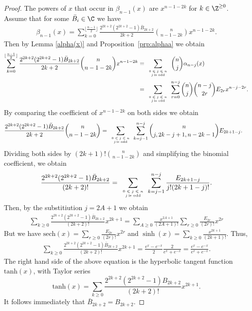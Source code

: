 \documentclass[11pt]{amsart}
\begin{document}
\begin{proof}
The powers of $x$ that occur in $\beta_{n-1}(x)$ are $x^{n-1-2k}$ for $k\in\Z^{\geq 0}$. Assume that for some  $\bar{B}_i\in\C$ we have 
\begin{align*}
\beta_{n-1}(x)=\sum_{k=0}^{\lfloor \frac{n-1}{2}\rfloor} \frac{2^{2k+2}(2^{2k+2}-1)\bar{B}_{2k+2}}{2k+2}
{n \choose n-1-2k}x^{n-1-2k}.
\end{align*}
Then by Lemma \ref{alpha(x)} and Proposition~\ref{prp:alphaa} we obtain
\begin{align*}
\sum_{k=0}^{\lfloor \frac{n-1}{2}\rfloor} \frac{2^{2k+2}(2^{2k+2}-1)\bar{B}_{2k+2}}{2k+2}
{n \choose n-1-2k}x^{n-1-2k}&=\sum_{\tiny
\begin{array}{cc}
0\leqslant j\leqslant n\\
j \, \text{is odd}
\end{array}} {n \choose j}\alpha_{n-j}(x)\\
&=\sum_{\tiny
\begin{array}{cc}
0\leqslant j\leqslant n\\
j \, \text{is odd}
\end{array}}\sum_{r=0}^{n-j} {n \choose j}{n-j \choose 2r}E_{2r}x^{n-j-2r}.
\end{align*}
By comparing the coefficient of $x^{n-1-2k}$ on both sides we obtain
\begin{align*}
&\frac{2^{2k+2}(2^{2k+2}-1)\bar{B}_{2k+2}}{2k+2}
{n \choose n-1-2k}
=\sum_{\tiny
\begin{array}{cc}
0\leqslant j\leqslant n\\
j \, \text{is odd}
\end{array}}\sum_{k=j-1}^{n-j}{n \choose j,2k-j+1,n-2k-1}E_{2k+1-j}.
\end{align*}
Dividing both sides by $(2k+1)!{n\choose n-1-2k}$ and simplifying the binomial coefficient, we obtain
\begin{align*}
\frac{2^{2k+2}(2^{2k+2}-1)\bar{B}_{2k+2}}{(2k+2)!}=
\sum_{\tiny
\begin{array}{cc}
0\leqslant j\leqslant n\\
j \, \text{is odd}
\end{array}}\sum_{k=j-1}^{n-j}\frac{E_{2k+1-j}}{j!(2k+1-j)!}.
\end{align*}
Then, by the substitiution $j=2A
+1$ we obtain 
\begin{align*}
\sum_{k\geqslant 0}\frac{2^{2k+2}(2^{2k+2}-1)\bar{B}_{2k+2}}{(2k+2)!}x^{2k+1}=\sum_{A\geqslant 0}\frac{x^{2A+1}}{(2A+1)!}\sum_{r\geqslant 0}\frac{E_{2r}}{(2r)!}x^{2r}
\end{align*}
But we have
$\text{sech}(x)=\sum_{r\geqslant 0}\frac{E_{2r}}{(2r)!}x^{2r} $ and $\sinh(x)=\sum_{k \geq 0} \frac{x^{2k+1}}{(2k+1)!}$.
Thus,
\begin{align*}
\sum_{k\geqslant 0}\frac{2^{2k+2}(2^{2k+2}-1)\bar{B}_{2k+2}}{(2k+2)!}x^{2k+1}
=\frac{e^x-e^{-x}}{2}\frac{2}{e^x+e^{-x}}=
\frac{e^x-e^{-x}}{e^x+e^{-x}}.
\end{align*}
The right hand side of the above equation is the hyperbolic tangent function $\text{tanh}(x)$, with Taylor series 
\[
\text{tanh}(x)=\sum_{k\geqslant 0}\frac{2^{2k+2}(2^{2k+2}-1)B_{2k+2}}{(2k+2)!}x^{2k+1}.
\]
It follows immediately that $\bar{B}_{2k+2}=B_{2k+2}$.
\end{proof}
\end{document}
